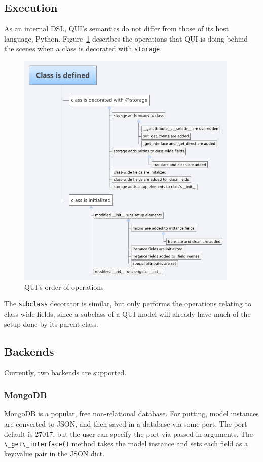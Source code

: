 \documentclass{article} %
\newcommand{\il}[1]{\mbox{\lstinline{#1}}}
\begin{document}
\subsection{Execution}
As an internal DSL, QUI's semantics do not differ from those of its host language, Python. Figure~\ref{fig:classdef} describes the operations that QUI is doing behind the scenes when
a class is decorated with \il{storage}.
\begin{figure}[htb]
\centering
\includegraphics[width=400px]{ClassDefTimeline}
\caption{QUI's order of operations}
\label{fig:classdef}
\end{figure}
The \il{subclass} decorator is similar, but only performs the operations relating to class-wide fields, since a subclass of a QUI model will already have much of the setup done by its parent class. 

\subsection{Backends}
Currently, two backends are supported. 
\subsubsection{MongoDB}
	MongoDB is a  popular, free non-relational database. For putting, model instances are converted to JSON, and then saved in a database via some port. The port default is 27017,
	but the user can specify the port via passed in arguments. The \il{\_get\_interface()} method takes the model instance and sets each field as a key:value pair in the JSON
	dict.
\end{document}
